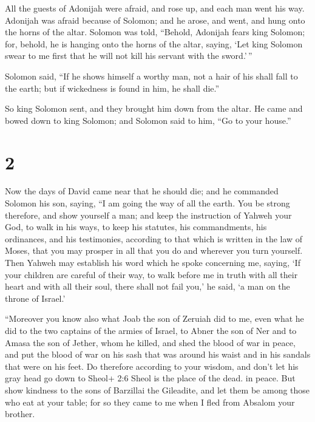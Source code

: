  All the guests of Adonijah were afraid, and rose up, and
each man went his way.  Adonijah was afraid because of
Solomon; and he arose, and went, and hung onto the horns of the altar.
 Solomon was told, ``Behold, Adonijah fears king Solomon;
for, behold, he is hanging onto the horns of the altar, saying, `Let
king Solomon swear to me first that he will not kill his servant with
the sword.'\,''

 Solomon said, ``If he shows himself a worthy man, not a
hair of his shall fall to the earth; but if wickedness is found in him,
he shall die.''

 So king Solomon sent, and they brought him down from the
altar. He came and bowed down to king Solomon; and Solomon said to him,
``Go to your house.''

\hypertarget{section-1}{%
\section{2}\label{section-1}}

 Now the days of David came near that he should die; and he
commanded Solomon his son, saying,  ``I am going the way of
all the earth. You be strong therefore, and show yourself a man;
 and keep the instruction of Yahweh your God, to walk in his
ways, to keep his statutes, his commandments, his ordinances, and his
testimonies, according to that which is written in the law of Moses,
that you may prosper in all that you do and wherever you turn yourself.
 Then Yahweh may establish his word which he spoke
concerning me, saying, `If your children are careful of their way, to
walk before me in truth with all their heart and with all their soul,
there shall not fail you,' he said, `a man on the throne of Israel.'

 ``Moreover you know also what Joab the son of Zeruiah did
to me, even what he did to the two captains of the armies of Israel, to
Abner the son of Ner and to Amasa the son of Jether, whom he killed, and
shed the blood of war in peace, and put the blood of war on his sash
that was around his waist and in his sandals that were on his feet.
 Do therefore according to your wisdom, and don't let his
gray head go down to Sheol+ 2:6 Sheol is the place of the dead. in
peace.  But show kindness to the sons of Barzillai the
Gileadite, and let them be among those who eat at your table; for so
they came to me when I fled from Absalom your brother.

